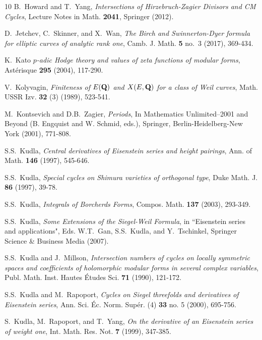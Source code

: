 \documentclass{amsart}
\theoremstyle{definition}
\begin{document}
\begin{thebibliography}{10}
 B.~Howard and T.~Yang, {\it{Intersections of Hirzebruch-Zagier Divisors and CM Cycles}}, Lecture Notes in Math. {\bf{2041}}, Springer (2012).

 D.~Jetchev, C.~Skinner, and X.~Wan, {\it{The Birch and Swinnerton-Dyer formula for elliptic curves of analytic rank one}}, Camb. J. Math. {\bf{5}} no.~3 (2017), 369-434.

 K.~Kato {\it{$p$-adic Hodge theory and values of zeta functions of modular forms}}, Ast\'{e}risque {\bf{295}} (2004), 117-290.

 V.~Kolyvagin, {\it{Finiteness of $E({\bf{Q}})$ and $X(E, {\bf{Q}})$ for a class of Weil curves}}, Math. USSR Izv. {\bf{32}} (3) (1989), 523-541.

 M.~Kontsevich and D.B.~Zagier, {\it{Periods}}, In Mathematics Unlimited--2001 and Beyond (B. Engquist and W. Schmid, eds.), Springer, Berlin-Heidelberg-New York (2001), 771-808.

 S.S.~Kudla, {\it{Central derivatives of Eisenstein series and height pairings}}, Ann. of Math. {\bf{146}} (1997), 545-646.

 S.S.~Kudla, {\it{Special cycles on Shimura varieties of orthogonal type}}, Duke Math. J. {\bf{86}} (1997), 39-78.

 S.S.~Kudla, {\it{Integrals of Borcherds Forms}}, Compos. Math. {\bf{137}} (2003), 293-349.


 S.S.~Kudla, {\it{Some Extensions of the Siegel-Weil Formula}}, in ``Eisenstein series and applications", Eds. W.T.~Gan, S.S.~Kudla, and Y.~Tschinkel, Springer Science \& Business Media (2007).

 S.S.~Kudla and J.~Millson, {\it{Intersection numbers of cycles on locally symmetric spaces and coefficients of holomorphic modular forms in several complex variables}}, 
Publ. Math. Inst. Hautes \'Etudes Sci. {\bf{71}} (1990), 121-172.

 S.S.~Kudla and M.~Rapoport, {\it{Cycles on Siegel threefolds and derivatives of Eisenstein series}}, Ann. Sci. \'Ec. Norm. Sup\'er. (4) {\bf{33}} no. 5 (2000), 695-756.

 S.~Kudla, M.~Rapoport, and T.~Yang, {\it{On the derivative of an Eisenstein series of weight one}}, Int. Math. Res. Not. {\bf{7}} (1999), 347-385.


\end{thebibliography}
\end{document}
